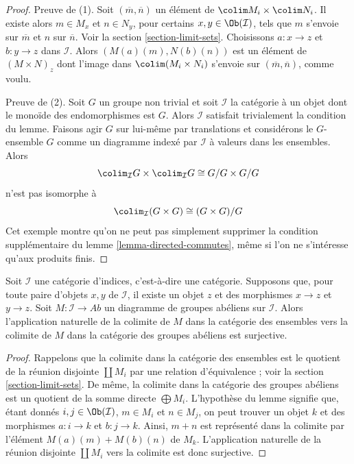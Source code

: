 \begin{proof}
Preuve de (1). Soit $(\overline{m}, \overline{n})$
un élément de $\colim M_i \times \colim N_i$.
Il existe alors $m \in M_x$ et $n \in N_y$, pour certains
$x, y \in \Ob(\mathcal{I})$, tels que $m$ s'envoie sur
$\overline{m}$ et $n$ sur $\overline{n}$. Voir la
section \ref{section-limit-sets}.
Choisissons $a : x \to z$ et $b : y \to z$
dans $\mathcal{I}$. Alors $(M(a)(m), N(b)(n))$ est un élément de
$(M \times N)_z$ dont l'image dans $\colim (M_i \times N_i)$
s'envoie sur $(\overline{m}, \overline{n})$, comme voulu.

\medskip\noindent
Preuve de (2). Soit $G$ un groupe non trivial et
soit $\mathcal{I}$ la catégorie à un objet dont le monoïde des
endomorphismes est $G$. Alors $\mathcal{I}$ satisfait trivialement la
condition du lemme. Faisons agir $G$ sur lui-même par translations et
considérons le $G$-ensemble $G$ comme un diagramme indexé par $\mathcal{I}$
à valeurs dans les ensembles. Alors
$$
\colim_\mathcal{I} G \times \colim_\mathcal{I} G \cong G/G \times G/G
$$
n'est pas isomorphe à
$$
\colim_\mathcal{I} (G \times G) \cong (G \times G)/G
$$
Cet exemple montre qu'on ne peut pas simplement supprimer la condition
supplémentaire du lemme \ref{lemma-directed-commutes},
même si l'on ne s'intéresse qu'aux produits finis.
\end{proof}

\begin{lemma}
\label{lemma-colimits-abelian-as-sets}
Soit $\mathcal{I}$ une catégorie d'indices, c'est-à-dire une catégorie.
Supposons que, pour toute paire d'objets $x, y$ de $\mathcal{I}$,
il existe un objet $z$ et des morphismes $x \to z$ et $y \to z$.
Soit $M : \mathcal{I} \to \textit{Ab}$ un diagramme de groupes abéliens
sur $\mathcal{I}$. Alors l'application naturelle de la colimite de $M$
dans la catégorie des ensembles vers la colimite de $M$ dans la catégorie
des groupes abéliens est surjective.
\end{lemma}

\begin{proof}
Rappelons que la colimite dans la catégorie des ensembles est le quotient
de la réunion disjointe $\coprod M_i$ par une relation d'équivalence ; voir la
section \ref{section-limit-sets}.
De même, la colimite dans la catégorie des groupes abéliens est un quotient
de la somme directe $\bigoplus M_i$.
L'hypothèse du lemme signifie que, étant donnés
$i, j \in \Ob(\mathcal{I})$, $m \in M_i$ et $n \in M_j$, on peut trouver
un objet $k$ et des morphismes $a : i \to k$ et $b : j \to k$.
Ainsi, $m + n$ est représenté dans la colimite par l'élément
$M(a)(m) + M(b)(n)$ de $M_k$. L'application naturelle de la réunion
disjointe $\coprod M_i$ vers la colimite est donc surjective.
\end{proof}

